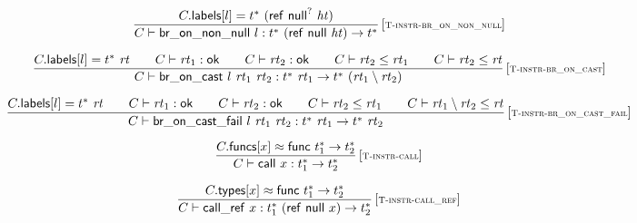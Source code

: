$$
\begin{array}{@{}c@{}}\displaystyle
\frac{
C{.}\mathsf{labels}{}[l] = {t^\ast}~(\mathsf{ref}~{\mathsf{null}^?}~{\mathit{ht}})
}{
C \vdash \mathsf{br\_on\_non\_null}~l : {t^\ast}~(\mathsf{ref}~\mathsf{null}~{\mathit{ht}}) \rightarrow {t^\ast}
} \, {[\textsc{\scriptsize T{-}instr{-}br\_on\_non\_null}]}
\qquad
\end{array}
$$

$$
\begin{array}{@{}c@{}}\displaystyle
\frac{
C{.}\mathsf{labels}{}[l] = {t^\ast}~{\mathit{rt}}
 \qquad
C \vdash {\mathit{rt}}_1 : \mathsf{ok}
 \qquad
C \vdash {\mathit{rt}}_2 : \mathsf{ok}
 \qquad
C \vdash {\mathit{rt}}_2 \leq {\mathit{rt}}_1
 \qquad
C \vdash {\mathit{rt}}_2 \leq {\mathit{rt}}
}{
C \vdash \mathsf{br\_on\_cast}~l~{\mathit{rt}}_1~{\mathit{rt}}_2 : {t^\ast}~{\mathit{rt}}_1 \rightarrow {t^\ast}~({\mathit{rt}}_1 \setminus {\mathit{rt}}_2)
} \, {[\textsc{\scriptsize T{-}instr{-}br\_on\_cast}]}
\qquad
\end{array}
$$

$$
\begin{array}{@{}c@{}}\displaystyle
\frac{
C{.}\mathsf{labels}{}[l] = {t^\ast}~{\mathit{rt}}
 \qquad
C \vdash {\mathit{rt}}_1 : \mathsf{ok}
 \qquad
C \vdash {\mathit{rt}}_2 : \mathsf{ok}
 \qquad
C \vdash {\mathit{rt}}_2 \leq {\mathit{rt}}_1
 \qquad
C \vdash {\mathit{rt}}_1 \setminus {\mathit{rt}}_2 \leq {\mathit{rt}}
}{
C \vdash \mathsf{br\_on\_cast\_fail}~l~{\mathit{rt}}_1~{\mathit{rt}}_2 : {t^\ast}~{\mathit{rt}}_1 \rightarrow {t^\ast}~{\mathit{rt}}_2
} \, {[\textsc{\scriptsize T{-}instr{-}br\_on\_cast\_fail}]}
\qquad
\end{array}
$$

\vspace{1ex}

$$
\begin{array}{@{}c@{}}\displaystyle
\frac{
C{.}\mathsf{funcs}{}[x] \approx \mathsf{func}~{t_1^\ast} \rightarrow {t_2^\ast}
}{
C \vdash \mathsf{call}~x : {t_1^\ast} \rightarrow {t_2^\ast}
} \, {[\textsc{\scriptsize T{-}instr{-}call}]}
\qquad
\end{array}
$$

$$
\begin{array}{@{}c@{}}\displaystyle
\frac{
C{.}\mathsf{types}{}[x] \approx \mathsf{func}~{t_1^\ast} \rightarrow {t_2^\ast}
}{
C \vdash \mathsf{call\_ref}~x : {t_1^\ast}~(\mathsf{ref}~\mathsf{null}~x) \rightarrow {t_2^\ast}
} \, {[\textsc{\scriptsize T{-}instr{-}call\_ref}]}
\qquad
\end{array}
$$

